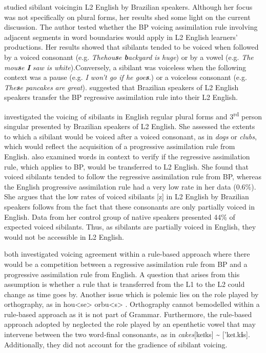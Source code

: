 \citet{zanfra2013} studied sibilant voicingin L2 English by Brazilian speakers.
Although her focus was not
specifically on plural forms, her results shed some light on the
current discussion. The author tested whether the BP voicing assimilation rule
involving adjacent segments in word boundaries would apply in L2
English learners' productions. Her results showed that sibilants tended to be
voiced when followed by a voiced consonant (e.g. \emph{The}\emph{hou\textbf{s}e
\textbf{b}ackyard} \emph{is huge}) or by a vowel
(e.g. \emph{The} \emph{mou\textbf{s}e \textbf{I}} \emph{saw is
white}).Conversely, a sibilant was voiceless when the following context was
a pause (e.g. \emph{I won't go if he goe\textbf{s}}.) or a voiceless consonant
(e.g. \emph{The\textbf{s}e pancakes} \emph{are great}). \citet{zanfra2013}
suggested that Brazilian speakers of L2 English speakers transfer the BP
regressive assimilation rule into their L2 English.

\citet{fragozo2017} investigated the
voicing of sibilants in English regular plural forms and 3\textsuperscript{rd}
person singular presented by Brazilian speakers of
L2 English. She assessed the extents to which a sibilant would be voiced after a
voiced consonant, as in \emph{dogs} or \emph{clubs}, which would
reflect the acquisition of a progressive assimilation rule from English.
\citet{fragozo2017} also examined words in context to verify if the
regressive assimilation rule, which applies to BP, would be transferred to L2
English. She found that voiced sibilants tended to follow the
regressive assimilation rule from BP, whereas the English
progressive assimilation rule had a very low rate in her data (0.6\%). She
argues that the low rates of voiced sibilants {[}z{]} in L2 English by Brazilian
speakers follows from the fact that these consonants are only
partially voiced in English. Data from her control group of native speakers
presented 44\% of expected voiced sibilants. Thus, as sibilants
are partially voiced in English, they would not be accessible in L2 English.

 both investigated voicing agreement
within a rule-based approach where there would be a competition between a
regressive assimilation rule from BP and a progressive assimilation
rule from English. A question that arises from this assumption is whether a rule
that is transferred from the L1 to the L2 could change as
time goes by. Another issue which is polemic lies on the role played
by orthography, as in hou\textless se\textgreater{}\emph{ }or\emph{}bu\textless s\textgreater{} 
\citep{zanfra2013}. Orthography cannot bemodelled
within a rule-based approach as it is not part of Grammar.
Furthermore, the rule-based approach adopted by 
neglected the role played by an epenthetic vowel that may intervene between the
two word-final consonants, as in \emph{cakes}{[}keɪks{]} \textasciitilde{}
{[}'keɪ.k\textbf{i}s{]}. Additionally,
they did not account for the gradience of sibilant voicing.


